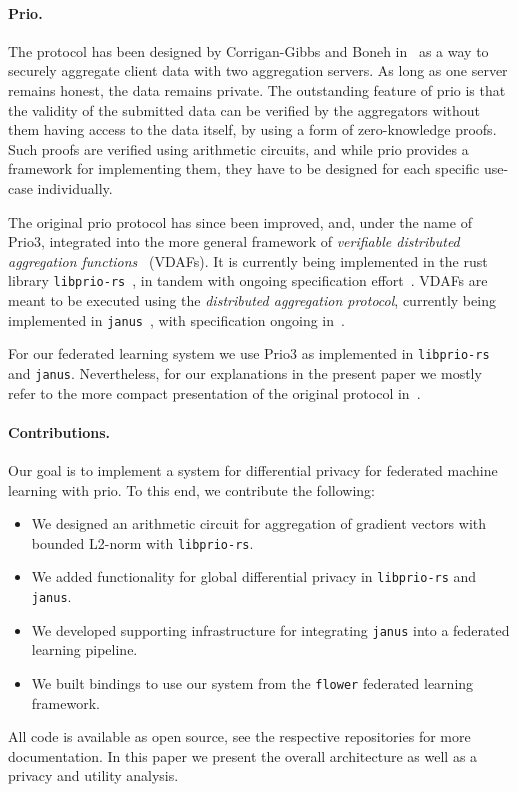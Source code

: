 \documentclass{article}
\begin{document}
\paragraph{Prio.} The protocol has been designed by Corrigan-Gibbs and Boneh in~\cite{prio} as a
way to securely aggregate client data with two aggregation servers. As long as
one server remains honest, the data remains private. The outstanding feature of
prio is that the validity of the submitted data can be verified by the
aggregators without them having access to the data itself, by using a form of
zero-knowledge proofs. Such proofs are verified using arithmetic circuits, and
while prio provides a framework for implementing them, they have to be designed
for each specific use-case individually.

The original prio protocol has since been improved, and, under the name of Prio3, integrated into the
more general framework of \textit{verifiable distributed aggregation
  functions}~\cite{vdaf} (VDAFs). It is currently being implemented in the rust library
\texttt{libprio-rs}~\cite{libprio-rs}, in tandem with ongoing specification effort~\cite{vdaf-draft}.
VDAFs are meant to be executed using the \textit{distributed aggregation
  protocol}, currently being implemented in \texttt{janus}~\cite{janus}, with
specification ongoing in~\cite{dap-draft}.

For our federated learning system we use Prio3
as implemented in \texttt{libprio-rs} and \texttt{janus}. Nevertheless, for our
explanations in the present paper
we mostly refer to the more compact presentation of the original protocol in~\cite{prio}.

\paragraph{Contributions.}
Our goal is to implement a system for differential privacy for federated
machine learning with prio. To this end, we contribute the following:
\begin{itemize}
  \setlength\itemsep{0em}
\item We designed an arithmetic circuit for aggregation of gradient vectors with
  bounded L2-norm with \texttt{libprio-rs}.
\item We added functionality for global differential privacy in
  \texttt{libprio-rs} and \texttt{janus}.
\item We developed supporting infrastructure for integrating \texttt{janus} into
  a federated learning pipeline.
\item We built bindings to use our system from the \texttt{flower} federated
  learning framework.
\end{itemize}
All code is available as open source, see the respective repositories for more
documentation. In this paper we present the overall architecture as well as a
privacy and utility analysis.
\end{document}

